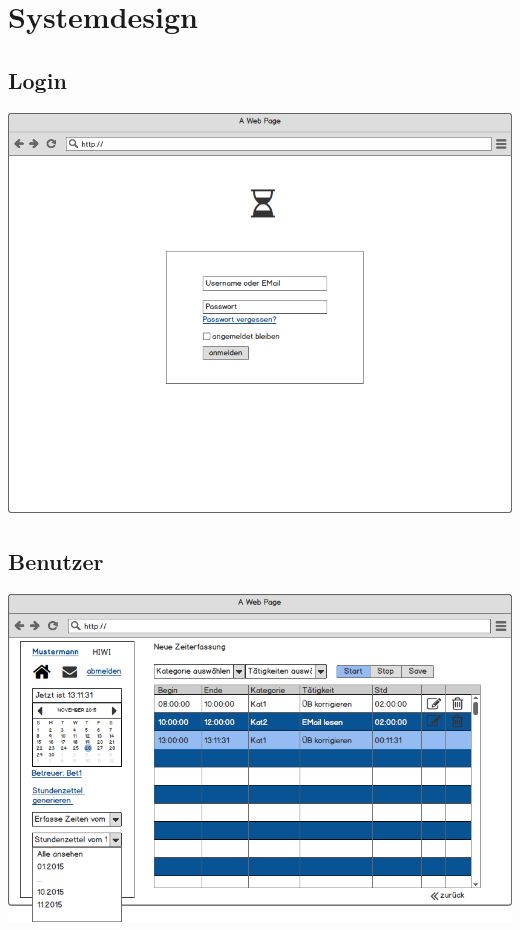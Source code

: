 \section{Systemdesign}

\subsection{Login}
\includegraphics[width=\linewidth]{UI/Login/Login.png}

\subsection{Benutzer}
\includegraphics[width=\linewidth]{UI/Benutzer/Zeiterfassung.png}

